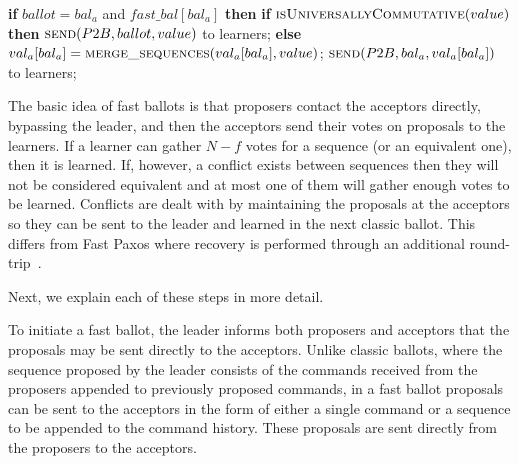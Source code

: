 \begin{algorithm}
\begin{algorithmic}[1]
		\State
		\State \textbf{if} $ballot = bal_a$ and $fast\_bal[bal_a]$ \textbf{then}
		\State \hspace{\algorithmicindent} \textbf{if} $\Call{isUniversallyCommutative}{value}$ \textbf{then}
		\State \hspace{\algorithmicindent}\hspace{\algorithmicindent} $\Call{send}{P2B, ballot, value}$ to learners;
		\State \hspace{\algorithmicindent}\textbf{else}
		\State \hspace{\algorithmicindent}\hspace{\algorithmicindent} $val_a[bal_a] =  \Call{merge\_sequences}{val_a[bal_a], value}$;
		\State \hspace{\algorithmicindent}\hspace{\algorithmicindent} $\Call{send}{P2B, bal_a, val_a[bal_a]}$ to learners;
		\EndFunction
	\end{algorithmic}
\end{algorithm}
The basic idea of fast ballots is that proposers contact the acceptors directly, bypassing the leader, and then the acceptors send their votes on proposals to the learners. If a learner can gather $N-f$ votes for a sequence (or an equivalent one), then it is learned. If, however, a conflict exists between sequences then they will not be considered equivalent and at most one of them will gather enough votes to be learned. Conflicts are dealt with by maintaining the proposals at the acceptors so they can be sent to the leader and learned in the next classic ballot. This differs from Fast Paxos where recovery is performed through an additional round-trip~\cite{Lamport2006}. \par
Next, we explain each of these steps in more detail.\par
{}
To initiate a fast ballot, the leader informs both proposers and acceptors that the proposals may be sent directly to the acceptors. Unlike classic ballots, where the sequence proposed by the leader consists of the commands received from the proposers appended to previously proposed commands, in a fast ballot proposals can be sent to the acceptors in the form of either a single command or a sequence to be appended to the command history. These proposals are sent directly from the proposers to the acceptors.\par

